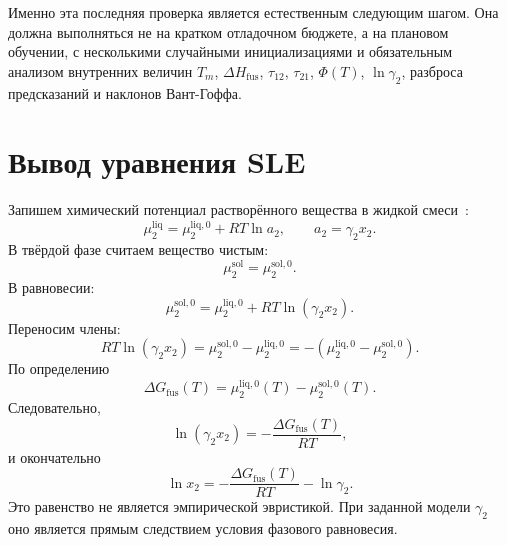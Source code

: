 \documentclass[11pt]{article}
\newcommand{\dGfus}{\Delta G_{\mathrm{fus}}}
\theoremstyle{definition}
\begin{document}
Именно эта последняя проверка является естественным следующим шагом. Она должна выполняться не на кратком отладочном бюджете, а на плановом обучении, с несколькими случайными инициализациями и обязательным анализом внутренних величин $T_m$, $\Delta H_{\mathrm{fus}}$, $\tau_{12}$, $\tau_{21}$, $\Phi(T)$, $\ln\gamma_2$, разброса предсказаний и наклонов Вант-Гоффа.

\newpage
\appendix
\makeatletter
\renewcommand\thesection{\AlphAlph{\value{section}}}
\renewcommand\thesubsection{\thesection.\arabic{subsection}}
\renewcommand\theHsection{app.\AlphAlph{\value{section}}}
\renewcommand\theHsubsection{\theHsection.\arabic{subsection}}
\makeatother

\section{Вывод уравнения SLE}
\label{app:sle}

Запишем химический потенциал растворённого вещества в жидкой смеси~\cite{prausnitz1998,hildebrand1970}:
\begin{equation*}
    \mu_2^{\mathrm{liq}} = \mu_2^{\mathrm{liq},0} + RT\ln a_2,
    \qquad
    a_2=\gamma_2 x_2.
\end{equation*}
В твёрдой фазе считаем вещество чистым:
\begin{equation*}
    \mu_2^{\mathrm{sol}}=\mu_2^{\mathrm{sol},0}.
\end{equation*}
В равновесии:
\begin{equation*}
    \mu_2^{\mathrm{sol},0}=\mu_2^{\mathrm{liq},0}+RT\ln(\gamma_2x_2).
\end{equation*}
Переносим члены:
\begin{equation*}
    RT\ln(\gamma_2x_2)=\mu_2^{\mathrm{sol},0}-\mu_2^{\mathrm{liq},0}
    =-\left(\mu_2^{\mathrm{liq},0}-\mu_2^{\mathrm{sol},0}\right).
\end{equation*}
По определению
\begin{equation*}
    \dGfus(T)=\mu_2^{\mathrm{liq},0}(T)-\mu_2^{\mathrm{sol},0}(T).
\end{equation*}
Следовательно,
\begin{equation*}
    \ln(\gamma_2x_2)=-\frac{\dGfus(T)}{RT},
\end{equation*}
и окончательно
\begin{equation*}
    \ln x_2=-\frac{\dGfus(T)}{RT}-\ln\gamma_2.
\end{equation*}
Это равенство не является эмпирической эвристикой. При заданной модели $\gamma_2$ оно является прямым следствием условия фазового равновесия.
\end{document}
